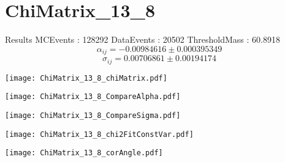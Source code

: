 \documentclass[a4paper,12pt]{article}
\begin{document}
\section{ChiMatrix\_13\_8}
\begin{minipage}{0.49\linewidth} Results \newline
MCEvents : 128292\newline
DataEvents : 20502 \newline
ThresholdMass : 60.8918\\
$$\alpha_{ij} = -0.00984616\pm 0.000395349$$
$$\sigma_{ij} = 0.00706861\pm 0.00194174$$
\end{minipage}\hfill
\begin{minipage}{0.49\linewidth} 
\texttt{[image: ChiMatrix\_13\_8\_chiMatrix.pdf]}\\
\end{minipage}
\hfill
\begin{minipage}{0.49\linewidth} 
\texttt{[image: ChiMatrix\_13\_8\_CompareAlpha.pdf]}\\
\end{minipage}
\hfill
\begin{minipage}{0.49\linewidth} 
\texttt{[image: ChiMatrix\_13\_8\_CompareSigma.pdf]}\\
\end{minipage}
\begin{minipage}{0.49\linewidth} 
\texttt{[image: ChiMatrix\_13\_8\_chi2FitConstVar.pdf]}\\
\end{minipage}
\hfill
\begin{minipage}{0.49\linewidth} 
\texttt{[image: ChiMatrix\_13\_8\_corAngle.pdf]}\\
\end{minipage}
\end{document}
